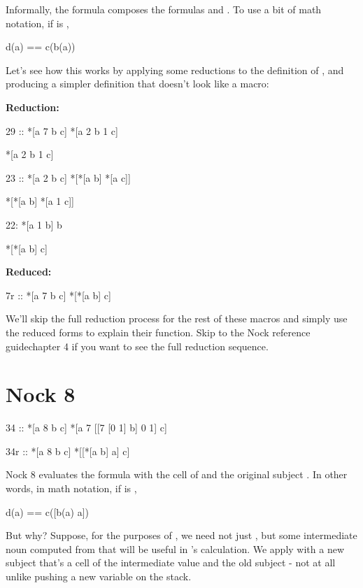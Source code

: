 Informally, the formula \kode{[7 b c]} composes the formulas  and
.  To use a bit of math notation, if  is \kode{[7 b c]},

\begin{code}
d(a) == c(b(a))
\end{code}
Let's see how this works by applying some reductions to the
definition of , and producing a simpler definition that
doesn't look like a macro:

\textbf{ Reduction:}

\begin{code}
29 ::    *[a 7 b c]        *[a 2 b 1 c]

*[a 2 b 1 c]

23 ::    *[a 2 b c]        *[*[a b] *[a c]]

*[*[a b] *[a 1 c]]

22:    *[a 1 b]          b

*[*[a b] c]
\end{code}
\textbf{ Reduced:}

\begin{code}
7r ::     *[a 7 b c]         *[*[a b] c]
\end{code}
We'll skip the full reduction process for the rest of these macros and simply use the reduced forms to explain their function. Skip to the Nock reference guidechapter 4 if you want to see the full reduction sequence.

\section{Nock 8}

\begin{code}
34 ::    *[a 8 b c]       *[a 7 [[7 [0 1] b] 0 1] c]

34r ::    *[a 8 b c]       *[[*[a b] a] c]
\end{code}

Nock 8 evaluates the formula  with the cell of \kode{*[a b]} and the original
subject .  In other words, in math notation, if  is \kode{[8 b c]},

\begin{code}
d(a) == c([b(a) a])
\end{code}
But why?  Suppose, for the purposes of , we need not just ,
but some intermediate noun computed from  that will be useful
in 's calculation.  We apply  with a new subject that's a
cell of the intermediate value and the old subject - not at all
unlike pushing a new variable on the stack.

